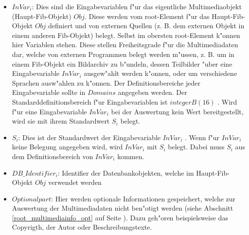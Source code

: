 \begin{itemize}
 \item $InVar_i$: Dies sind die Eingabevariablen f"ur das eigentliche Multimediaobjekt (Haupt-Fib-Objekt) $Obj$. Diese werden vom root-Element f"ur das Haupt-Fib-Objekt $Obj$ definiert und von externen Quellen (z. B. dem externen Objekt in einem anderen Fib-Objekt) belegt. Selbst im obersten root-Element k"onnen hier Variablen stehen. Diese stellen Freiheitsgrade f"ur die Multimediadaten dar, welche von externen Programmen belegt werden m"ussen, z. B. um in einem Fib-Objekt ein Bildarchiv zu b"undeln, dessen Teilbilder "uber eine Eingabevariable $InVar_i$ ausgew"ahlt werden k"onnen, oder um verschiedene Sprachen ausw"ahlen zu k"onnen. Der Definitionsbereiche jeder Eingabevariable sollte in $Domains$ angegeben werden. Der Standarddefinitionsbereich f"ur Eingabevariablen ist $integerB(16)$ . Wird f"ur eine Eingabevariable $InVar_i$ bei der Auswertung kein Wert bereitgestellt, wird sie mit ihrem Standardwert $S_i$ belegt. 
 \item $S_i$: Dies ist der Standardwert der Eingabevariable $InVar_i$ . Wenn f"ur $InVar_i$ keine Belegung angegeben wird, wird $InVar_i$ mit $S_i$ belegt. Dabei muss $S_i$ aus dem Definitionsbereich von $InVar_i$ kommen.
 \item $DB\_Identifier_i$: Identifier der Datenbankobjekten, welche im Haupt-Fib-Objekt $Obj$ verwendet werden
 \item $Optionalpart$: Hier werden optionale Informationen gespeichert, welche zur Auswertung der Multimediadaten nicht ben"otigt werden (siehe Abschnitt \ref{root_multimediainfo_opt} auf Seite \pageref{root_multimediainfo_opt}). Dazu geh"oren beispielsweise das Copyrigth, der Autor oder Beschreibungstexte.
\end{itemize}


